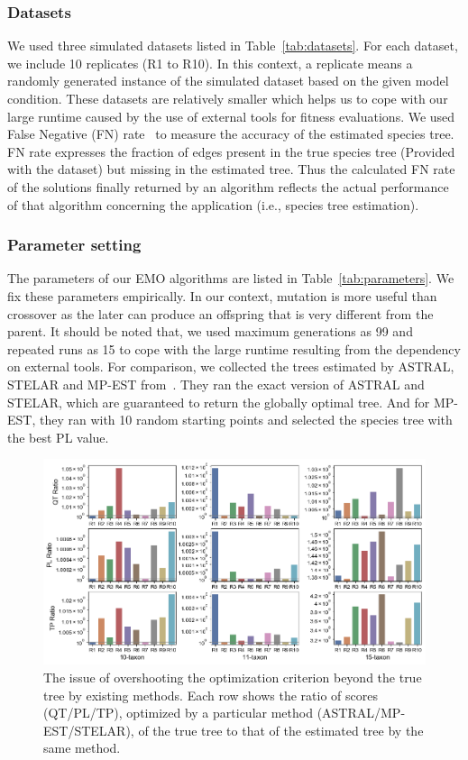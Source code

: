 \subsubsection{Datasets}
We used three simulated datasets listed in Table~\ref{tab:datasets}. For each dataset, we include 10 replicates (R1 to R10). In this
context, a replicate means a randomly generated instance of the simulated dataset based on the
 given model condition. These datasets are relatively smaller which helps us to cope with our large runtime caused by the use of external tools for fitness evaluations.
We used False Negative (FN) rate~\cite{bayzid2013naive} to measure the accuracy of the estimated species tree. FN rate expresses the fraction of edges present in the true species tree (Provided with the dataset) but missing in the estimated tree. Thus the calculated FN rate of the solutions finally returned by an algorithm reflects the actual performance of that algorithm concerning the application (i.e., species tree estimation).

\subsubsection{Parameter setting}
The parameters of our EMO algorithms are listed in Table~\ref{tab:parameters}. We fix these parameters empirically. In our context, mutation is more useful than crossover as the later can produce an offspring that is very different from the parent. It should be noted that, we used maximum generations as 99 and repeated runs as 15 to cope with the large runtime resulting from the dependency on external tools. 
For comparison, we collected the trees estimated by ASTRAL, STELAR and MP-EST from~\cite{islam2019stelar}. They ran the exact version of ASTRAL and STELAR, which are guaranteed to return the globally optimal tree. And for MP-EST, they ran with 10 random starting points and selected the species tree with the best PL value.   




\begin{figure}[!htbp]
\centering    
		\includegraphics[width=1\textwidth]{Figure/tool_ratio}
\caption[The issue of overshooting the optimization criterion beyond the true tree by existing methods.]{The issue of overshooting the optimization criterion beyond the true tree by existing methods. Each row shows the ratio of scores (QT/PL/TP), optimized by a particular method (ASTRAL/MP-EST/STELAR), of the true tree to that of the estimated tree by the same method.} \label{fig:tool_ratio}
\end{figure}

